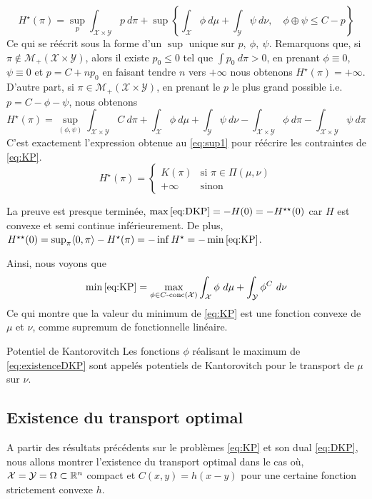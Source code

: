 \documentclass[a4paper,12pt]{article}
\begin{document}
\begin{preuve}
$$
H^{\star}(\pi)= \sup_p \int_{\mathcal{X}\times\mathcal{Y}} p\ d\pi + \sup \left\{ \int_{\mathcal{X}}\phi\ d\mu + \int_{\mathcal{Y}}\psi\ d\nu, \quad \phi\oplus\psi\leq C- p \right\}
$$
Ce qui se réécrit sous la forme d'un $\sup$ unique sur $p,\ \phi,\ \psi$. Remarquons que, si $\pi\notin\mathcal{M}_+(\mathcal{X}\times\mathcal{Y})$, alors il existe $p_0\leq 0$ tel que $\int p_0\ d\pi >0$, en prenant $\phi\equiv 0$, $\psi\equiv 0$ et $p=C+np_0$ en faisant tendre $n$ vers $+\infty$ nous obtenons $H^{\star}(\pi)=+\infty$.\\
D'autre part, si $\pi\in\mathcal{M}_+(\mathcal{X}\times\mathcal{Y})$, en prenant le $p$ le plus grand possible i.e. $p=C-\phi-\psi$, nous obtenons 
$$
H^{\star}(\pi)=  \sup_{(\phi,\psi)} \int_{\mathcal{X}\times\mathcal{Y}} C\ d\pi + \int_{\mathcal{X}}\phi\ d\mu + \int_{\mathcal{Y}}\psi\ d\nu - \int_{\mathcal{X}\times\mathcal{Y}} \phi\ d\pi -\int_{\mathcal{X}\times\mathcal{Y}} \psi\ d\pi
$$
C'est exactement l'expression obtenue au \eqref{eq:sup1} pour réécrire les contraintes de \eqref{eq:KP}. 
$$
H^{\star}(\pi)=\left\{
\begin{array}{cl}
K(\pi) & \text{si } \pi \in\Pi(\mu,\nu)\\
+\infty & \text{sinon}
\end{array}
\right.
$$

La preuve est presque terminée, $\max\eqref{eq:DKP} = -H(0) =- H^{\star\star}(0)$ car $H$ est convexe et semi continue inférieurement. De plus, $H^{\star\star}(0)=\sup_{\pi}\langle 0,\pi\rangle-H^{\star}(\pi)=-\inf H^{\star}=-\min\eqref{eq:KP}$.
\end{preuve}

Ainsi, nous voyons que 
$$
\min\eqref{eq:KP}= \max_{\phi\in C\text{-conc}(\mathcal{X})}\int_{\mathcal{X}}\phi\ d\mu +\int_{\mathcal{Y}} \phi^C\ d\nu
$$
Ce qui montre que la valeur du minimum de \eqref{eq:KP} est une fonction convexe de $\mu$ et $\nu$, comme supremum de fonctionnelle linéaire. 
\begin{definition}{Potentiel de Kantorovitch}
Les fonctions $\phi$ réalisant le maximum de \eqref{eq:existenceDKP} sont appelés potentiels de Kantorovitch pour le transport de $\mu$ sur $\nu$.
\end{definition}

\subsection{Existence du transport optimal}

A partir des résultats précédents sur le problèmes \eqref{eq:KP} et son dual \eqref{eq:DKP}, nous allons montrer l'existence du transport optimal dans le cas où, $\mathcal{X}=\mathcal{Y}=\Omega\subset\mathbb{R}^n$ compact et $C(x,y)=h(x-y)$ pour une certaine fonction strictement convexe $h$. 
\end{document}
